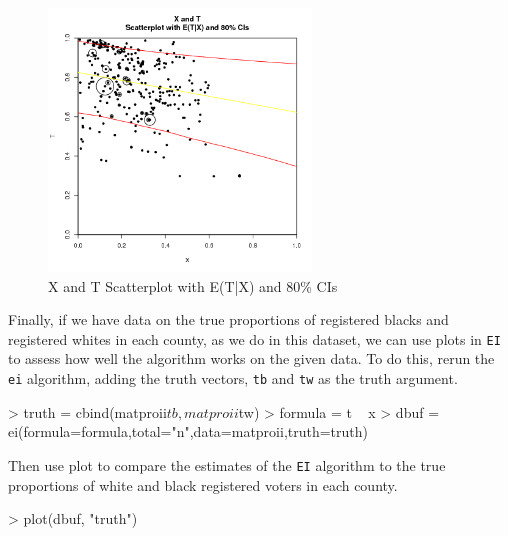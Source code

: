 \documentclass[11pt,oneside,letterpaper,titlepage]{article}
\begin{document}
\begin{figure}[h]
\begin{center}
\includegraphics[width=2.75in, height=2.75in, viewport=0 0 420 400,clip]{xtfit.png} 
\end{center}
\caption{X and T Scatterplot with E(T|X) and 80\% CIs}
\label{fig:xtfit}
\end{figure}

\pagebreak
\noindent Finally, if we have data on the true proportions of registered blacks and registered whites in each county, as we do in this dataset, we can use plots in \verb#EI# to assess how well the algorithm works on the given data.  To do this, rerun the \verb#ei# algorithm, adding the truth vectors, \verb#tb# and \verb#tw# as the truth argument.

\begin{Schunk}
\begin{Sinput}
> truth = cbind(matproii$tb,matproii$tw)
> formula = t ~ x
> dbuf = ei(formula=formula,total="n",data=matproii,truth=truth)
\end{Sinput}
\end{Schunk}

\noindent Then use plot to compare the estimates of the \verb#EI# algorithm to the true proportions of white and black registered voters in each county.

\begin{Schunk}
\begin{Sinput}
> plot(dbuf, "truth")
\end{Sinput}
\end{Schunk}
\end{document}
